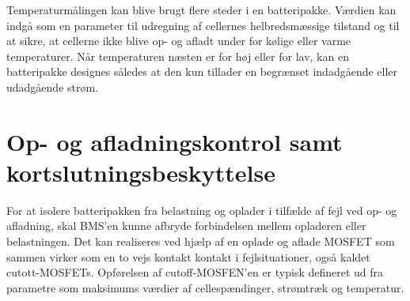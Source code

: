 Temperaturmålingen kan blive brugt flere steder i en batteripakke. Værdien kan indgå som en parameter til udregning af cellernes helbredsmæssige tilstand og til at sikre, at cellerne ikke blive op- og afladt under for kølige eller varme temperaturer. Når temperaturen næsten er for høj eller for lav, kan en batteripakke designes således at den kun tillader en begrænset indadgående eller udadgående strøm.

\section{Op- og afladningskontrol samt kortslutningsbeskyttelse}
For at isolere batteripakken fra belastning og oplader i tilfælde af fejl ved op- og afladning, skal BMS'en kunne afbryde forbindelsen mellem opladeren eller belastningen. Det kan realiseres ved hjælp af en oplade og aflade MOSFET som sammen virker som en to vejs kontakt kontakt i fejlsituationer, også kaldet cutott-MOSFETs. Opførelsen af cutoff-MOSFEN'en er typisk defineret ud fra parametre som maksimums værdier af cellespændinger, strømtræk og temperatur. 
\
